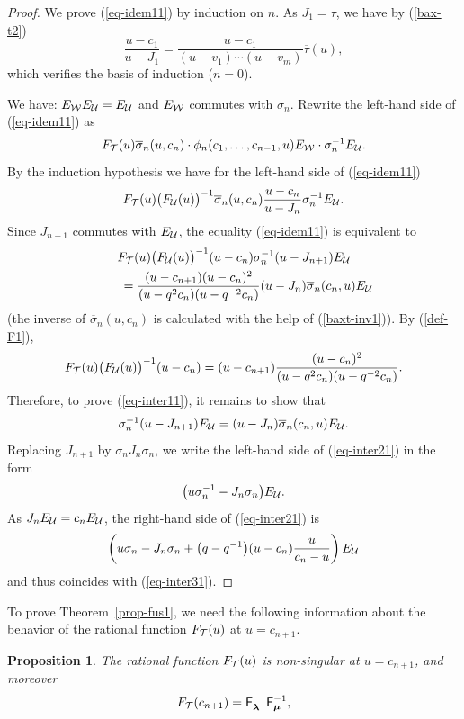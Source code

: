 \documentclass[pdftex]{sigma}
\newcommand{\bsi}{{\overline{\sigma}}}
\newcommand{\bta}{{\overline{\tau}}}
\newcommand{\lam}{\boldsymbol{\lambda}}
\newcommand{\mum}{\boldsymbol{\mu}}
\newtheorem{Proposition}[Theorem]{Proposition}
\begin{document}
\begin{proof} We prove (\ref{eq-idem11}) by induction on $n$.
As $J_1=\tau$, we have by (\ref{bax-t2})
\[
\frac{u-c_{1}}{u-J_{1}}=\frac{u-c_{1}}{(u-v_1)\cdots(u-v_m)}\bta(u)  ,
\]
which verif\/ies the basis of induction ($n=0$).


We have: $E_{{\cal{W}}}E_{{\cal{U}}}=E_{{\cal{U}}}$ and $E_{{\cal{W}}}$ commutes with $\sigma_n$.
Rewrite the left-hand side of (\ref{eq-idem11}) as
\[
F_{{\cal{T}}}(u)\bsi_{n}(u,c_n)\cdot\phi_n(c_1,\dots,c_{n-1},u) E_{{\cal{W}}}\cdot\sigma_n^{-1} E_{{\cal{U}}} .
 \]
By the induction hypothesis we have for the left-hand side of (\ref{eq-idem11})
\[
F_{{\cal{T}}}(u)\bigl(F_{{\cal{U}}}(u)\bigr)^{-1}\bsi_{n}(u,c_n)\frac{u-c_n}{u-J_n}\sigma_n^{-1} E_{{\cal{U}}} .
\]
Since $J_{n+1}$ commutes with $E_{{\cal{U}}}$, the equality (\ref{eq-idem11}) is equivalent to
\begin{gather}
F_{{\cal{T}}}(u)\bigl(F_{{\cal{U}}}(u)\bigr)^{-1}(u-c_n)\sigma_n^{-1}(u-J_{n+1})E_{{\cal{U}}}\nonumber\\
\qquad{}=
 {\frac{(u-c_{n+1})(u-c_n)^2}{(u-q^2c_n)(u-q^{-2}c_n)}}(u-J_n)\bsi_{n}(c_n,u)E_{{\cal{U}}} \label{eq-inter11}
\end{gather}
(the inverse of $\bsi_{n}(u,c_n)$ is calculated with the help of (\ref{baxt-inv1})).
By (\ref{def-F1}),
\begin{gather*}%
F_{{\cal{T}}}(u)\bigl(F_{{\cal{U}}}(u)\bigr)^{-1}(u-c_n)=(u-c_{n+1})\frac{(u-c_n)^2}{(u-q^2c_n)(u-q^{-2}c_n)}.
\end{gather*}
Therefore, to prove (\ref{eq-inter11}), it remains to show that
\begin{gather}\label{eq-inter21}
\sigma_n^{-1}(u-J_{n+1})E_{{\cal{U}}}=(u-J_n)\bsi_{n}(c_n,u)E_{{\cal{U}}}.
\end{gather}
Replacing $J_{n+1}$ by $\sigma_nJ_n\sigma_n$, we write the left-hand side of (\ref{eq-inter21}) in the form
\begin{gather}\label{eq-inter31}
\big(u\sigma_n^{-1}-J_{n}\sigma_n\big)E_{{\cal{U}}}  .
\end{gather}
As  $J_nE_{{\cal{U}}}=c_nE_{{\cal{U}}}$, the right-hand side of (\ref{eq-inter21}) is
\begin{gather*}%
\left(u\sigma_n-J_n\sigma_n+\big(q-q^{-1}\big)(u-c_n)\frac{u}{c_n-u}\right)E_{{\cal{U}}}
\end{gather*}
and thus coincides with  (\ref{eq-inter31}).
\end{proof}


To prove Theorem~\ref{prop-fus1}, we need the following
information about the behavior of the rational function $F_{{\cal{T}}}(u)$ at $u=c_{n+1}$.
\begin{Proposition}\label{prop-f1}
The rational function $F_{{\cal{T}}}(u)$ is non-singular at $u=c_{n+1}$, and moreover
\begin{gather*}%
F_{{\cal{T}}}(c_{n+1})=\mathsf{F}^{\phantom{-1}}_{\lam}  \mathsf{F}_{\mum}^{-1} ,
\end{gather*}
\end{Proposition}
\end{document}
